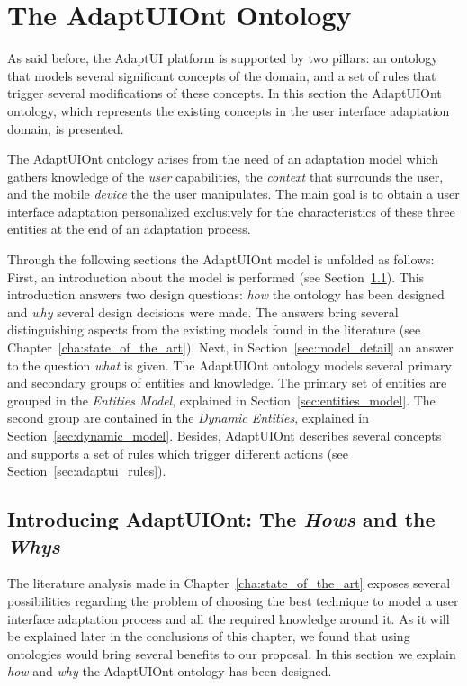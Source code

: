 \section{The AdaptUIOnt Ontology}
\label{sec:adaptui_model}

As said before, the AdaptUI platform is supported by two pillars: an ontology
that models several significant concepts of the domain, and a set of rules
that trigger several modifications of these concepts. In this section the
AdaptUIOnt ontology, which represents the existing concepts in the user
interface adaptation domain, is presented.
  
The AdaptUIOnt ontology arises from the need of an adaptation model which gathers
knowledge of the \textit{user} capabilities, the \textit{context} that surrounds
the user, and the mobile \textit{device} the the user manipulates. The main goal
is to obtain a user interface adaptation personalized exclusively for the
characteristics of these three entities at the end of an adaptation process.

Through the following sections the AdaptUIOnt model is unfolded as follows: 
First, an introduction about the model is performed (see Section~\ref{sec:model_introduction}).
This introduction answers two design questions: \textit{how} the ontology has
been designed and \textit{why} several design decisions were made. The answers
bring several distinguishing aspects from the existing models found in the
literature (see Chapter~\ref{cha:state_of_the_art}). Next, in Section~\ref{sec:model_detail}
an answer to the question \textit{what} is given. The AdaptUIOnt ontology models
several primary and secondary groups of entities and knowledge. The primary
set of entities are grouped in the \textit{Entities Model}, explained in
Section~\ref{sec:entities_model}. The second group are contained in the
\textit{Dynamic Entities}, explained in Section~\ref{sec:dynamic_model}. Besides,
AdaptUIOnt describes several concepts and supports a set of rules which trigger
different actions (see Section~\ref{sec:adaptui_rules}).


\subsection{Introducing AdaptUIOnt: The \textit{Hows} and the \textit{Whys}}
\label{sec:model_introduction}

The literature analysis made in Chapter~\ref{cha:state_of_the_art} exposes
several possibilities regarding the problem of choosing the best technique
to model a user interface adaptation process and all the required knowledge
around it. As it will be explained later in the conclusions of this chapter, we
found that using ontologies would bring several benefits to our proposal. In 
this section we explain \textit{how} and \textit{why} the AdaptUIOnt ontology 
has been designed.

